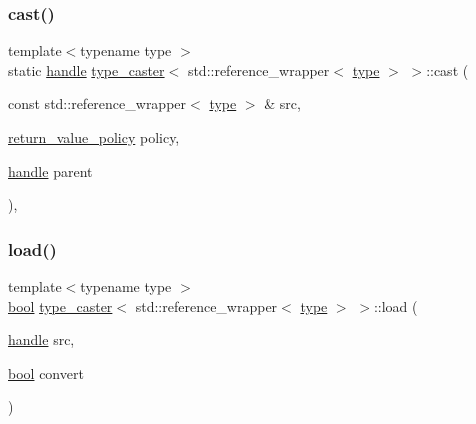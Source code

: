 \subsubsection{\texorpdfstring{cast()}{cast()}}
{\footnotesize\ttfamily template$<$typename type $>$ \\
static \mbox{\hyperlink{classhandle}{handle}} \mbox{\hyperlink{classtype__caster}{type\+\_\+caster}}$<$ std\+::reference\+\_\+wrapper$<$ \mbox{\hyperlink{_s_d_l__opengl_8h_ad5ddf6fca7b585646515660e810e0188}{type}} $>$ $>$\+::cast (\begin{DoxyParamCaption}\item[{const std\+::reference\+\_\+wrapper$<$ \mbox{\hyperlink{_s_d_l__opengl_8h_ad5ddf6fca7b585646515660e810e0188}{type}} $>$ \&}]{src,  }\item[{\mbox{\hyperlink{detail_2common_8h_adde72ab1fb0dd4b48a5232c349a53841}{return\+\_\+value\+\_\+policy}}}]{policy,  }\item[{\mbox{\hyperlink{classhandle}{handle}}}]{parent }\end{DoxyParamCaption})\hspace{0.3cm}{\ttfamily [inline]}, {\ttfamily [static]}}

\mbox{\label{classtype__caster_3_01std_1_1reference__wrapper_3_01type_01_4_01_4_ae3db464b00bc218012b7a111b90fd1c2}} 
\subsubsection{\texorpdfstring{load()}{load()}}
{\footnotesize\ttfamily template$<$typename type $>$ \\
\mbox{\hyperlink{asdl_8h_af6a258d8f3ee5206d682d799316314b1}{bool}} \mbox{\hyperlink{classtype__caster}{type\+\_\+caster}}$<$ std\+::reference\+\_\+wrapper$<$ \mbox{\hyperlink{_s_d_l__opengl_8h_ad5ddf6fca7b585646515660e810e0188}{type}} $>$ $>$\+::load (\begin{DoxyParamCaption}\item[{\mbox{\hyperlink{classhandle}{handle}}}]{src,  }\item[{\mbox{\hyperlink{asdl_8h_af6a258d8f3ee5206d682d799316314b1}{bool}}}]{convert }\end{DoxyParamCaption})\hspace{0.3cm}{\ttfamily [inline]}}


